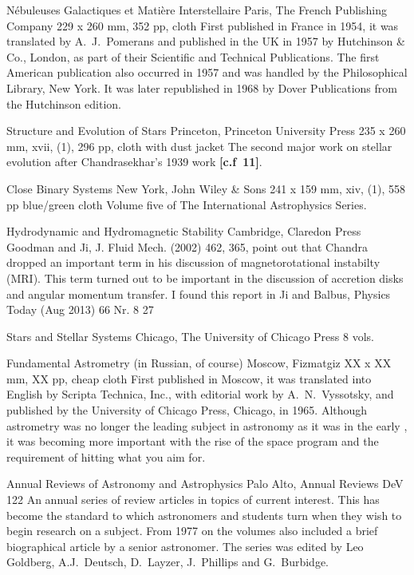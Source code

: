 {N\'{e}buleuses Galactiques et Mati\`{e}re Interstellaire}
{Paris, The French Publishing Company}
{229 x 260 mm, 352 pp, cloth}
{}
First published in France in 1954, it was translated by A.\ J.\ Pomerans
and published in the UK in 1957 by Hutchinson \& Co., London, as part of their Scientific and 
Technical Publications.  The first American publication also occurred in 1957 and was 
handled by the Philosophical Library, New York. It was later republished in 1968 by Dover
Publications from the Hutchinson edition.

{Structure and Evolution of Stars}
{Princeton, Princeton University Press}
{235 x 260 mm, xvii, (1), 296 pp, cloth with dust jacket}
{}
The second major work on stellar evolution after Chandrasekhar's 1939 work {\bf [c.f\ 11]}.

{Close Binary Systems}
{New York, John Wiley \& Sons}
{241 x 159 mm, xiv, (1), 558 pp blue/green cloth}
{}
Volume five of The International Astrophysics Series.

{Hydrodynamic and Hydromagnetic Stability}
{Cambridge, Claredon Press}
{}
{}
Goodman and Ji, J. Fluid Mech. (2002) 462, 365, point out that Chandra
dropped an important term in his discussion of magnetorotational
instabilty (MRI). This term turned out to be important in the
discussion of accretion disks and angular momentum transfer.  I found
this report in Ji and Balbus, Physics Today (Aug 2013) 66 Nr. 8 27

{Stars and Stellar Systems}
{Chicago, The University of Chicago Press}
{8 vols.}
{}

{Fundamental Astrometry (in Russian, of course)}
{Moscow, Fizmatgiz}
{XX x XX mm, XX pp, cheap cloth}
{}
First published in Moscow, it was translated into English by Scripta
Technica, Inc., with editorial work by A.\ N.\ Vyssotsky, and published
by the University of Chicago Press, Chicago, in 1965.  Although astrometry
was no longer the leading subject in astronomy as it was in the early ,
it was becoming more important with the rise of the space program and the requirement
of hitting what you aim for.

{Annual Reviews of Astronomy and Astrophysics}
{Palo Alto, Annual Reviews}
{}
{DeV 122}
An annual series of review articles in topics of current interest.  This has become
the standard to which astronomers and students turn when they wish to
begin research on a subject.  From 1977 on the volumes also included a brief biographical
article by a senior astronomer. The series was edited by Leo Goldberg, A.J.\ Deutsch,
D.\ Layzer, J.\ Phillips and G.\ Burbidge.


